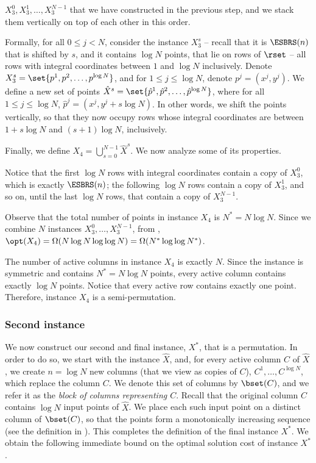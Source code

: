 \documentclass{toc}
\begin{document}
$X^0_3,X^1_3,\ldots,X^{N-1}_3$ that we have constructed in the previous step, and we stack them vertically on top of each other in this order. 

Formally, for all $0\leq j< N$, consider the instance $X^s_3$ -- recall that it is $\ESBRS(n)$ that is shifted by $s$, and it contains $\log N$ points, that lie on rows of $\rset$ -- all rows with integral coordinates between $1$ and $\log N$ inclusively.
Denote $X^s_3=\set{p^1,p^2,\ldots,p^{\log N}}$, and for $1\leq j\leq \log N$, denote $p^j=(x^j,y^j)$. We define a new set of points $\hat X^s=\set{\hat p^1,\hat p^2,\ldots,\hat p^{\log N}}$, where for all $1\leq j\leq \log N$, $\hat p^j=(x^j,y^j+s\log N)$. In other words, we shift the points vertically, so that they now occupy rows whose integral coordinates are between $1+s\log N$ and $(s+1)\log N$, inclusively.

Finally, we define $X_4=\bigcup_{s=0}^{N-1}\hat X^s$. We now analyze some of its properties.

Notice that the first $\log N$ rows with integral coordinates contain a copy of $X^0_3$, which is exactly $\ESBRS(n)$; the following $\log N$ rows contain a copy of $X^1_3$, and so on, until the last $\log N$ rows, that contain a copy of $X^{N-1}_3$.

Observe that the total number of points in instance $X_4$ is $N^*=N\log N$. Since we combine $N$ instances $X^0_3,\ldots,X^{N-1}_3$, from , $\opt(X_4)=\Omega(N\log N\log\log N)=\Omega(N^*\log\log N^*)$. 

The number of active columns in instance $X_4$ is exactly $N$. Since the instance is symmetric and contains $N^*=N\log N$ points, every active column contains exactly $\log N$ points. Notice that every active row contains exactly one point. Therefore, instance $X_4$ is a semi-permutation.
\fi 



%
%
%
%
%
%
%
\subsubsection{Second instance}


We now construct our second and final instance, $X^*$, that is a permutation. 
In order to do so, we start with the instance $\hat{X}$, and, for every active column $C$ of $\hat{X}$, we create $n= \log N$ new columns (that we view as copies of $C$), $C^1,\ldots,C^{\log N}$, which replace the column $C$. 
We denote this set of columns by $\bset(C)$, and we refer it as the \emph{block of columns representing $C$}. 
Recall that the original column $C$ contains $\log N$ input points of $\hat{X}$. 
We place each such input point on a distinct column of $\bset(C)$, so that the points form a monotonically increasing sequence (see the definition in ). This completes the definition of the final instance $X^*$.
%
We obtain the following immediate bound on the optimal solution cost of instance $X^*$.
\end{document}
